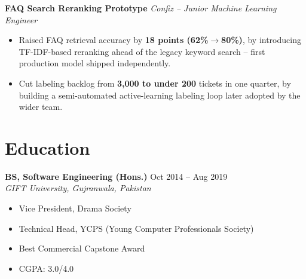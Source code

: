 \documentclass[10.5pt,letterpaper]{article}
\newcommand{\projheader}[3]{%
  \textbf{#1} \hfill \textit{#2 -- #3}%
}
\begin{document}
\vspace{5pt}
\projheader{FAQ Search Reranking Prototype}{Confiz}{Junior Machine Learning Engineer}
\begin{itemize}
  \item Raised FAQ retrieval accuracy by \textbf{18 points (62\%$\rightarrow$80\%)}, by introducing TF-IDF-based reranking ahead of the legacy keyword search -- first production model shipped independently.
  \item Cut labeling backlog from \textbf{3,000 to under 200} tickets in one quarter, by building a semi-automated active-learning labeling loop later adopted by the wider team.
\end{itemize}

\section*{Education}
\textbf{BS, Software Engineering (Hons.)} \hfill Oct 2014 -- Aug 2019 \\
\textit{GIFT University, Gujranwala, Pakistan}
\begin{itemize}
  \item Vice President, Drama Society
  \item Technical Head, YCPS (Young Computer Professionals Society)
  \item Best Commercial Capstone Award
  \item CGPA: 3.0/4.0
\end{itemize}
\end{document}
